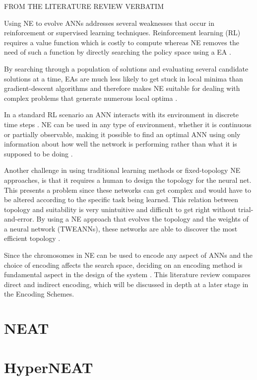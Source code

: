 FROM THE LITERATURE REVIEW VERBATIM


Using NE to evolve ANNs addresses several weaknesses that occur in reinforcement or supervised learning techniques. Reinforcement learning (RL) requires a value function which is costly to compute whereas NE removes the need of such a function by directly searching the policy space using a EA \cite{RefWorks:32}.

By searching through a population of solutions and evaluating several candidate solutions at a time, EAs are much less likely to get stuck in local minima than gradient-descent algorithms and therefore makes NE suitable for dealing with complex problems that generate numerous local optima \cite{gomez2001neuro,RefWorks:1}.

In a standard RL scenario an ANN interacts with its environment in discrete time steps \cite{igel2003neuroevolution}. NE can be used in any type of environment, whether it is continuous or partially observable, making it possible to find an optimal ANN using only information about how well the network is performing rather than what it is supposed to be doing \cite{Miikkulainen:2010:ENN:1830761.1830902}.

Another challenge in using traditional learning methods or fixed-topology NE approaches, is that it requires a human to design the topology for the neural net. This presents a problem since these networks can get complex and would have to be altered according to the specific task being learned. This relation between topology and suitability is very unintuitive and difficult to get right without trial-and-error. By using a NE approach that evolves the topology and the weights of a neural network (TWEANNs), these networks are able to discover the most efficient topology \cite{RefWorks:31}.

Since the chromosomes in NE can be used to encode any aspect of ANNs and the choice of encoding affects the search space, deciding on an encoding method is fundamental aspect in the design of the system \cite{RefWorks:31}. This literature review compares direct and indirect encoding, which will be discussed in depth at a later stage in the Encoding Schemes.


\section{NEAT}

\section{HyperNEAT}




